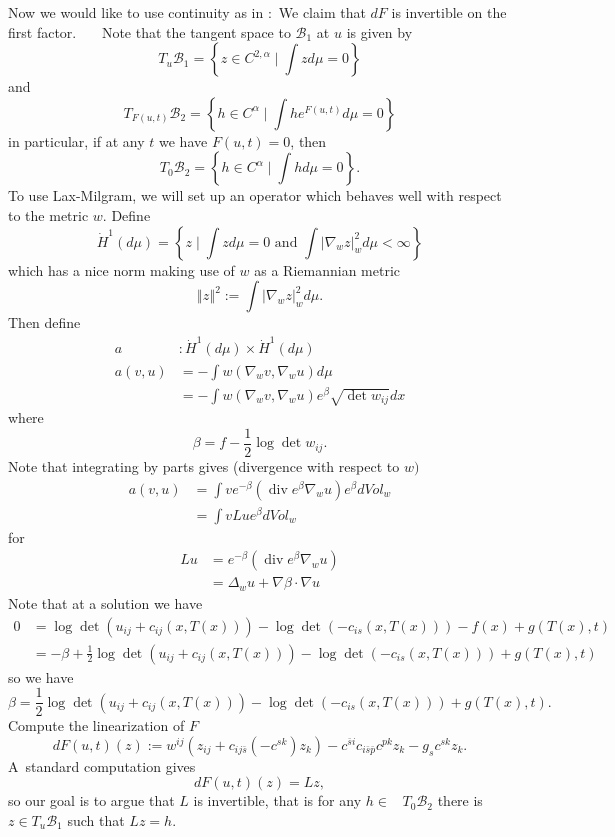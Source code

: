 \documentclass[11pt,letterpaper]{amsart}%
\numberwithin{equation}{section}
\begin{document}
Now we would like to use continuity as in \cite[Theorem 17.6]{GT}:\ We
claim that $dF$ is invertible on the first factor. \ \ \ Note that the tangent
space to $\mathcal{B}_{1}$ at $u$ is given by
\[
T_{u}\mathcal{B}_{1}=\left\{  z\in C^{2,\alpha}\mid\int zd\mu=0\right\}
\]
and%
\[
T_{F(u,t)}\mathcal{B}_{2}=\left\{  h\in C^{\alpha}\mid\int he^{F(u,t)}%
d\mu=0\right\}
\]
in particular, if at any $t$ we have $F(u,t)=0$, then%
\[
T_{0}\mathcal{B}_{2}=\left\{  h\in C^{\alpha}\mid\int hd\mu=0\right\}.
\]
To use Lax-Milgram, we will set up an operator which behaves well with respect
to the metric $w.$ Define%
\[
\dot{H}^{1}(d\mu)=\left\{  z\mid\int zd\mu=0\text{ and }\int\left\vert
\nabla_{w}z\right\vert _{w}^{2}d\mu<\infty\right\}
\]
which has a nice norm making use of $w$ as a Riemannian metric
\[
\left\Vert z\right\Vert ^{2}:=\int\left\vert \nabla_{w}z\right\vert _{w}%
^{2}d\mu.
\]
Then define
\begin{align*}
a  &  :\dot{H}^{1}(d\mu)\times\dot{H}^{1}(d\mu)\\
a\left(  v,u\right)   &  =-\int w\left(  \nabla_{w}v,\nabla_{w}u\right)
d\mu\\
&  =-\int w\left(  \nabla_{w}v,\nabla_{w}u\right)  e^{\beta}\sqrt{\det w_{ij}%
}dx
\end{align*}
where
\[
\beta=f-\frac{1}{2}\log\det w_{ij}.
\]
Note that integrating by parts gives (divergence with respect to $w)$
\begin{align*}
a\left(  v,u\right)   &  =\int ve^{-\beta}\left(  \operatorname{div}e^{\beta
}\nabla_{w}u\right)  e^{\beta}dVol_{w}\\
&  =\int vLue^{\beta}dVol_{w}%
\end{align*}
for
\begin{align*}
Lu  &  =e^{-\beta}\left(  \operatorname{div}e^{\beta}\nabla_{w}u\right) \\
&  =\Delta_{w}u+\nabla\beta\cdot\nabla u
\end{align*}
Note that at a solution we have%
\begin{align*}
0  &  =\log\det\left(  u_{ij}+c_{ij}(x,T(x))\right)  -\log\det(-c_{is}%
(x,T(x)))-f(x)+g(T(x),t)\\
&  =-\beta+\frac{1}{2}\log\det\left(  u_{ij}+c_{ij}(x,T(x))\right)  -\log
\det(-c_{is}(x,T(x)))+g(T(x),t)
\end{align*}
so we have
\[
\beta=\frac{1}{2}\log\det\left(  u_{ij}+c_{ij}(x,T(x))\right)  -\log
\det(-c_{is}(x,T(x)))+g(T(x),t).
\]
Compute the linearization of $F$
\[
dF(u,t)(z):=w^{ij}\left(  z_{ij}+c_{ij\bar{s}}\left(  -c^{sk}\right)
z_{k}\right)  -c^{\bar{s}i}c_{i\bar{s}\bar{p}}c^{pk}z_{k}-g_{s}c^{sk}z_{k}.
\]
A\ standard computation gives
\[
dF(u,t)(z)=Lz, 
\]
so our goal is to argue that $L$ is invertible, that is for any $h\in$%
\ $T_{0}\mathcal{B}_{2}$ there is $z\in T_{u}\mathcal{B}_{1}$ such that
$Lz=h.$ \ \ 
\end{document}
